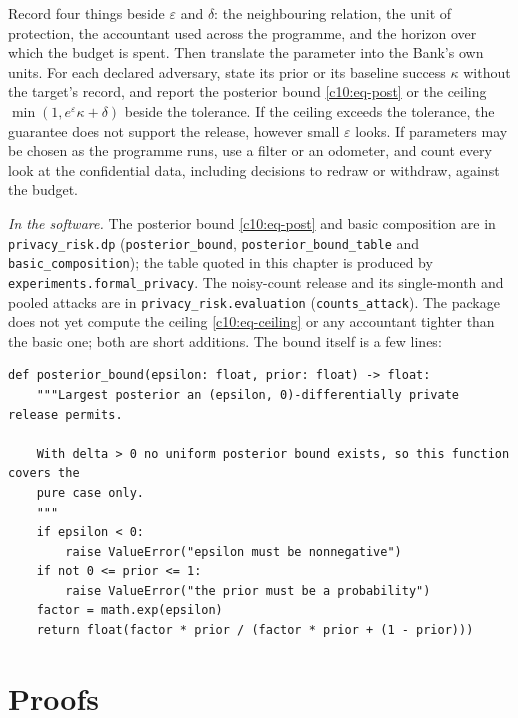 \begin{inpractice}
Record four things beside $\varepsilon$ and $\delta$: the neighbouring relation,
the unit of protection, the accountant used across the programme, and the horizon
over which the budget is spent. Then translate the parameter into the Bank's own
units. For each declared adversary, state its prior or its baseline success
$\kappa$ without the target's record, and report the posterior bound
\eqref{c10:eq-post} or the ceiling $\min(1, e^\varepsilon\kappa + \delta)$ beside
the tolerance. If the ceiling exceeds the tolerance, the guarantee does not support
the release, however small $\varepsilon$ looks. If parameters may be chosen as the
programme runs, use a filter or an odometer, and count every look at the
confidential data, including decisions to redraw or withdraw, against the budget.

\sloppy\smallskip\noindent\textit{In the software.} The posterior bound
\eqref{c10:eq-post} and basic composition are in \texttt{privacy\_risk.dp}
(\texttt{posterior\_bound}, \texttt{posterior\_bound\_table} and
\texttt{basic\_composition}); the table quoted in this chapter is produced by
\texttt{experiments.formal\_privacy}. The noisy-count release and its single-month
and pooled attacks are in \texttt{privacy\_risk.evaluation}
(\texttt{counts\_attack}). The package does not yet compute the ceiling
\eqref{c10:eq-ceiling} or any accountant tighter than the basic one; both are
short additions. The bound itself is a few lines:
\begin{lstlisting}
def posterior_bound(epsilon: float, prior: float) -> float:
    """Largest posterior an (epsilon, 0)-differentially private release permits.

    With delta > 0 no uniform posterior bound exists, so this function covers the
    pure case only.
    """
    if epsilon < 0:
        raise ValueError("epsilon must be nonnegative")
    if not 0 <= prior <= 1:
        raise ValueError("the prior must be a probability")
    factor = math.exp(epsilon)
    return float(factor * prior / (factor * prior + (1 - prior)))
\end{lstlisting}
\end{inpractice}

\section{Proofs}

